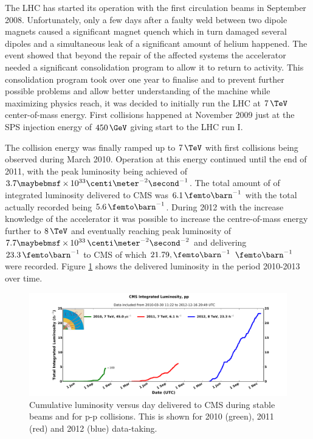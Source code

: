 The \gls{LHC} has started its operation with the first circulation beams in September 2008. Unfortunately, only a few days after a faulty weld between two dipole magnets caused a significant magnet quench which in turn damaged several dipoles and a simultaneous leak of a significant amount of helium happened. The event showed that beyond the repair of the affected systems the accelerator needed a significant consolidation program to allow it to return to activity\cite{ARTICLE:CMSReportIncident19Sep2008}. This consolidation program took over one year to finalise and to prevent further possible problems and allow better understanding of the machine while maximizing physics reach, it was decided to initially run the \gls{LHC} at $7\,\TeV$ center-of-mass energy.
First collisions happened at November 2009 just at the \gls{SPS} injection energy of $450\,\GeV$ giving start to the \gls{LHC} run I.

The collision energy was finally ramped up to $7\,\TeV$ with first collisions being observed during March 2010. Operation at this energy continued until the end of 2011, with the peak luminosity being achieved of $3.7 \times 10^{33} \centi\meter^{-2}\second^{-1}$. The total amount of of integrated luminosity delivered to \gls{CMS} was $6.1\,\femto\barn^{-1}$ with the total actually recorded being $5.6\,\femto\barn^{-1}$. During 2012 with the increase knowledge of the accelerator it was possible to increase the centre-of-mass energy further to $8\,\TeV$ and eventually reaching peak luminosity of $7.7 \times 10^{33}\,\centi\meter^{-2}\second^{-2}$ and delivering $23.3\,\femto\barn^{-1}$ to \gls{CMS} of which $21.79,\femto\barn^{-1}$  $\femto\barn^{-1}$ were recorded. Figure \ref{FIGURE:ExperimentalApparatus_CMS_IntegratedLumi_pp_2010-2012} shows the delivered luminosity in the period 2010-2013 over time.

\begin{figure}[!htb]
  \centering
  \includegraphics[width=1.00\textwidth]{Chapter02/CMS/Images/CMS_IntegratedLumi_pp_2010-2012}
  \caption{Cumulative luminosity versus day delivered to CMS during stable beams and for p-p collisions. This is shown for 2010 (green), 2011 (red) and 2012 (blue) data-taking.}
  \label{FIGURE:ExperimentalApparatus_CMS_IntegratedLumi_pp_2010-2012}
\end{figure}

